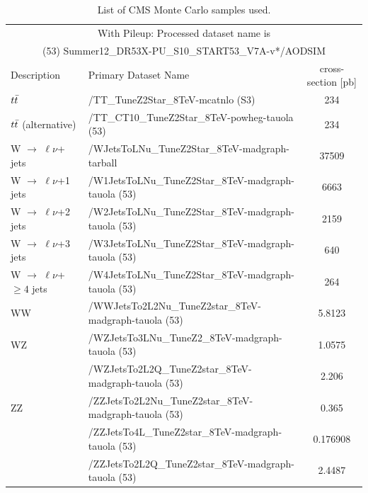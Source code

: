 \begin{table}[!ht]
\begin{center}
\caption{List of CMS Monte Carlo samples used.}
\label{tab:afb:mcsamples}
{\footnotesize
\begin{tabular}{l|l|c}
\hline
\multicolumn{3}{c}{With Pileup: Processed dataset name is} \\
\multicolumn{3}{c}{(53) Summer12\_DR53X-PU\_S10\_START53\_V7A-v*/AODSIM} \\
\hline
 Description                     &   Primary Dataset Name   & cross-section [pb]\\
\hline
$t\bar{t}$                                                     &   /TT\_TuneZ2Star\_8TeV-mcatnlo (S3)                            & 234 \\
$t\bar{t}$ (alternative)                                           &   /TT\_CT10\_TuneZ2Star\_8TeV-powheg-tauola (53)           & 234 \\
W $\rightarrow$ $\ell\nu$+ jets                &   /WJetsToLNu\_TuneZ2Star\_8TeV-madgraph-tarball                             & 37509\\
W $\rightarrow$ $\ell\nu$+1 jets               &   /W1JetsToLNu\_TuneZ2Star\_8TeV-madgraph-tauola (53)                        &  6663  \\
W $\rightarrow$ $\ell\nu$+2 jets               &   /W2JetsToLNu\_TuneZ2Star\_8TeV-madgraph-tauola (53)                        &  2159 \\
W $\rightarrow$ $\ell\nu$+3 jets               &   /W3JetsToLNu\_TuneZ2Star\_8TeV-madgraph-tauola (53)                        &   640 \\
W $\rightarrow$ $\ell\nu$+$\geq 4$ jets        &   /W4JetsToLNu\_TuneZ2Star\_8TeV-madgraph-tauola (53)                        &   264 \\
WW      & /WWJetsTo2L2Nu\_TuneZ2star\_8TeV-madgraph-tauola (53) &   5.8123\\
WZ      & /WZJetsTo3LNu\_TuneZ2\_8TeV-madgraph-tauola (53)              &   1.0575\\
        & /WZJetsTo2L2Q\_TuneZ2star\_8TeV-madgraph-tauola (53)          &   2.206\\
ZZ      & /ZZJetsTo2L2Nu\_TuneZ2star\_8TeV-madgraph-tauola (53)         &   0.365\\
        & /ZZJetsTo4L\_TuneZ2star\_8TeV-madgraph-tauola (53)            &   0.176908\\
        & /ZZJetsTo2L2Q\_TuneZ2star\_8TeV-madgraph-tauola (53)          &   2.4487\\

\end{tabular}}
\end{center}
\end{table}
